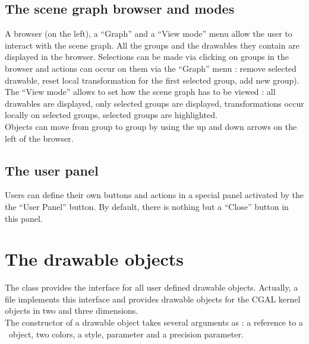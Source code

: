 \subsection{The scene graph browser and modes}

A browser (on the left), a ``Graph'' and a ``View mode'' menu 
allow the user to interact with the scene graph. All the groups 
and the drawables they contain are displayed in the
browser. Selections can be made via clicking on groups in the browser
and actions can occur on them via the ``Graph'' menu : remove
selected drawable, reset local transformation for the first selected group, 
add new group).\\
The ``View mode'' allows to set how the scene graph has to be viewed : 
all drawables are displayed, only selected groups are displayed,
transformations occur locally on selected groups, selected groups are 
highlighted. \\
Objects can move from group to group by using the up and down arrows
on the left of the browser.

\subsection{The user panel}

Users can define their own buttons and actions in a special panel
activated by the the ``User Panel'' button. By default, there is nothing 
but a ``Close'' button in this panel.

\section{The drawable objects}

The class  provides the interface for all user
defined drawable objects. Actually, a file 
implements this interface and provides drawable objects for the CGAL
kernel objects in two and three dimensions.\\
The constructor of a drawable object takes several arguments as :
a reference to a \cgal\ object, two colors, a style, parameter and a
precision parameter.

